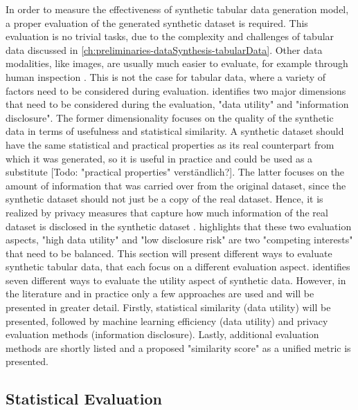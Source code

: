 In order to measure the effectiveness of synthetic tabular data generation model, a proper evaluation of the generated synthetic dataset is required.
This evaluation is no trivial tasks, due to the complexity and challenges of tabular data discussed in \autoref{ch:preliminaries-dataSynthesis-tabularData}.
Other data modalities, like images, are usually much easier to evaluate, for example through human inspection \cite{chundawat2022UniversalMetricRobust}. 
This is not the case for tabular data, where a variety of factors need to be considered during evaluation.
\cite{goncalves2020GenerationEvaluationSynthetic} identifies two major dimensions that need to be considered during the evaluation, "data utility" and "information disclosure".
The former dimensionality focuses on the quality of the synthetic data in terms of usefulness and statistical similarity.
A synthetic dataset should have the same statistical and practical properties as its real counterpart from which it was generated, so it is useful in practice and could be used as a substitute  [Todo: "practical properties" verständlich?].
The latter focuses on the amount of information that was carried over from the original dataset, since the synthetic dataset should not just be a copy of the real dataset.
Hence, it is realized by privacy measures that capture how much information of the real dataset is disclosed in the synthetic dataset \cite{goncalves2020GenerationEvaluationSynthetic}.
\cite[p. 2]{little2021GenerativeAdversarialNetworksa} highlights that these two evaluation aspects, "high data utility" and "low disclosure risk" are two "competing interests" that need to be balanced.
This section will present different ways to evaluate synthetic tabular data, that each focus on a different evaluation aspect.
\cite{elemam2020SevenWaysEvaluate} identifies seven different ways to evaluate the utility aspect of synthetic data.
However, in the literature and in practice only a few approaches are used and will be presented in greater detail.
Firstly, statistical similarity (data utility) will be presented, followed by machine learning efficiency (data utility) and privacy evaluation methods (information disclosure).
Lastly, additional evaluation methods are shortly listed and a proposed "similarity score" as a unified metric is presented.

\subsection{Statistical Evaluation}
\label{ch:preliminaries-statisticalEvaluation}

